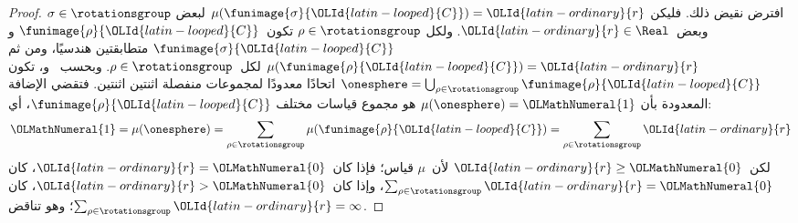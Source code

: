 \documentclass[../../../include/open-logic-section]{subfiles}
\begin{document}
\begin{proof}
افترض نقيض ذلك. فليكن
$\mu(\funimage{\sigma}{{\OLId{latin-looped}{C}}}) = {\OLId{latin-ordinary}{r}}$ لبعض
$\sigma \in \rotationsgroup$ وبعض~${\OLId{latin-ordinary}{r}} \in \Real$. ولكل
$\rho \in \rotationsgroup$ تكون~$\funimage{\rho}{{\OLId{latin-looped}{C}}}$ و
$\funimage{\sigma}{{\OLId{latin-looped}{C}}}$ متطابقتين هندسيًا، ومن ثم
$\mu(\funimage{\rho}{{\OLId{latin-looped}{C}}}) = {\OLId{latin-ordinary}{r}}$ لكل~$\rho \in \rotationsgroup$.
وبحسب~ و، تكون
$\onesphere =
\bigcup_{\rho \in \rotationsgroup}\funimage{\rho}{{\OLId{latin-looped}{C}}}$ اتحادًا
معدودًا لمجموعات منفصلة اثنتين اثنتين. فتقضي الإضافة المعدودة بأن
$\mu(\onesphere) = {\OLMathNumeral{1}}$ هو مجموع قياسات مختلف
$\funimage{\rho}{{\OLId{latin-looped}{C}}}$، أي:
\[
	{\OLMathNumeral{1}} = \mu(\onesphere) = \sum_{\rho \in \rotationsgroup}\mu(\funimage{\rho}{{\OLId{latin-looped}{C}}}) = \sum_{\rho \in \rotationsgroup}{\OLId{latin-ordinary}{r}}
\]
لكن~${\OLId{latin-ordinary}{r}} \geq {\OLMathNumeral{0}}$ لأن~$\mu$ قياس؛ فإذا كان~${\OLId{latin-ordinary}{r}} = {\OLMathNumeral{0}}$، كان
$\sum_{\rho \in \rotationsgroup}{\OLId{latin-ordinary}{r}} = {\OLMathNumeral{0}}$، وإذا كان~${\OLId{latin-ordinary}{r}} > {\OLMathNumeral{0}}$، كان
$\sum_{\rho \in \rotationsgroup}{\OLId{latin-ordinary}{r}} = \infty$؛ وهو تناقض.
\end{proof}
\end{document}
